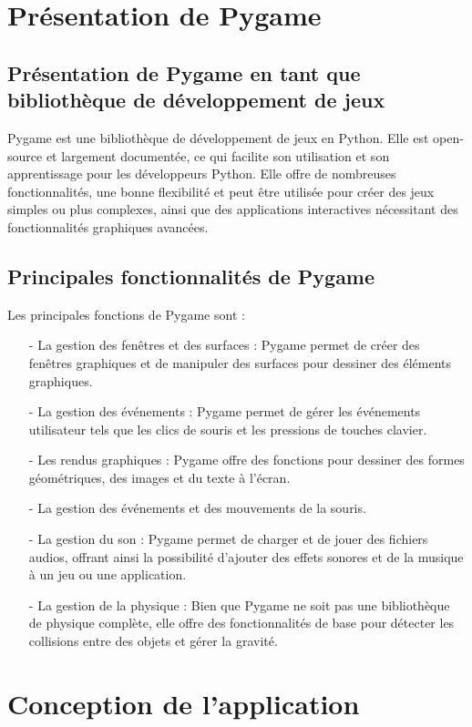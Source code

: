 \documentclass[a4paper, 12px]{article}
\begin{document}
\section{Présentation de Pygame }


\subsection{Présentation de Pygame en tant que bibliothèque de développement de jeux}
Pygame est une bibliothèque de développement de jeux en Python. Elle est open-source et largement documentée, ce qui facilite son utilisation et son apprentissage pour les développeurs Python. Elle offre de nombreuses fonctionnalités, une bonne flexibilité et peut être utilisée pour créer des jeux simples ou plus complexes, ainsi que des applications interactives nécessitant des fonctionnalités graphiques avancées.

\subsection{Principales fonctionnalités de Pygame}
\par Les principales fonctions de Pygame sont : 

\begin{itemize}
\item[-] La gestion des fenêtres et des surfaces : Pygame permet de créer des fenêtres graphiques et de manipuler des surfaces pour dessiner des éléments graphiques.
\item[-] La gestion des événements : Pygame permet de gérer les événements utilisateur tels que les clics de souris et les pressions de touches clavier.
\item[-] Les rendus graphiques : Pygame offre des fonctions pour dessiner des formes géométriques, des images et du texte à l'écran. 
\item[-] La gestion des événements et des mouvements de la souris. 
\item[-] La gestion du son : Pygame permet de charger et de jouer des fichiers audios, offrant ainsi la possibilité d'ajouter des effets sonores et de la musique à un jeu ou une application. 
\item[-] La gestion de la physique : Bien que Pygame ne soit pas une bibliothèque de physique complète, elle offre des fonctionnalités de base pour détecter les collisions entre des objets et gérer la gravité. 
\end{itemize}


\section{Conception de l'application}
\end{document}
